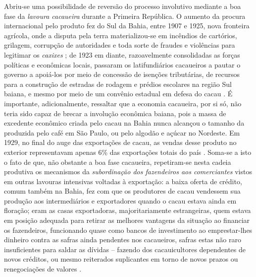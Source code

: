 Abriu-se uma possibilidade de reversão do processo involutivo mediante a boa fase da \textit{lavoura cacaueira} durante a Primeira República. O aumento da procura internacional pelo produto fez do Sul da Bahia, entre 1907 e 1925, nova fronteira agrícola, onde a disputa pela terra materializou-se em incêndios de cartórios, grilagem, corrupção de autoridades e toda sorte de fraudes e violências para legitimar os \textit{caxixes} \cite[pp.~78-79]{CPE1980}; de 1923 em diante, razoavelmente consolidadas as forças políticas e econômicas locais, passaram os latifundiários cacaueiros a pautar o governo a apoiá-los por meio de concessão de isenções tributárias, de recursos para a construção de estradas de rodagem e prédios escolares na região Sul baiana, e mesmo por meio de um convênio estadual em defesa do cacau \cite[p.~77]{sampaio_legislativo_1985}. É importante, adicionalmente, ressaltar que a economia cacaueira, por si só, não teria sido capaz de brecar a involução econômica baiana, pois a massa de excedente econômico criada pelo cacau na Bahia nunca alcançou o tamanho da produzida pelo café em São Paulo, ou pelo algodão e açúcar no Nordeste. Em 1929, no final do auge das exportações de cacau, as vendas desse produto no exterior representavam apenas 6\% das exportações totais do país \cite[p.~20]{CPE1980}. Soma-se a isto o fato de que, não obstante a boa fase cacaueira, repetiram-se nesta cadeia produtiva os mecanismos da \textit{subordinação dos fazendeiros aos comerciantes} vistos em outras lavouras intensivas voltadas à exportação: a baixa oferta de crédito, comum também na Bahia, fez com que os produtores de cacau vendessem sua produção aos intermediários e exportadores quando o cacau estava ainda em floração; eram as casas exportadoras, majoritariamente estrangeiras, quem estava em posição adequada para retirar as melhores vantagens da situação ao financiar os fazendeiros, funcionando quase como bancos de investimento ao emprestar-lhes dinheiro contra as safras ainda pendentes nos cacaueiros, safras estas não raro insuficientes para saldar as dívidas -- fazendo dos cacauicultores dependentes de novos créditos, ou mesmo reiterados suplicantes em torno de novos prazos ou renegociações de valores \cite[p.~229]{perissinotto_cladom_1994}. 

